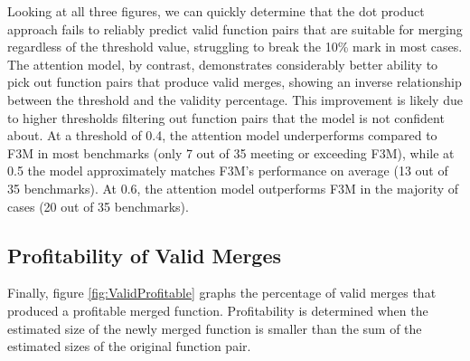 Looking at all three figures, we can quickly determine that the dot product approach fails to reliably predict valid function pairs that are suitable for merging regardless of the threshold value, struggling to break the 10\% mark in most cases. The attention model, by contrast, demonstrates considerably better ability to pick out function pairs that produce valid merges, showing an inverse relationship between the threshold and the validity percentage. This improvement is likely due to higher thresholds filtering out function pairs that the model is not confident about. At a threshold of 0.4, the attention model underperforms compared to F3M in most benchmarks (only 7 out of 35 meeting or exceeding F3M), while at 0.5 the model approximately matches F3M's performance on average (13 out of 35 benchmarks). At 0.6, the attention model outperforms F3M in the majority of cases (20 out of 35 benchmarks).

\subsection{Profitability of Valid Merges}
Finally, figure \ref{fig:ValidProfitable} graphs the percentage of valid merges that produced a profitable merged function. Profitability is determined when the estimated size of the newly merged function is smaller than the sum of the estimated sizes of the original function pair.

